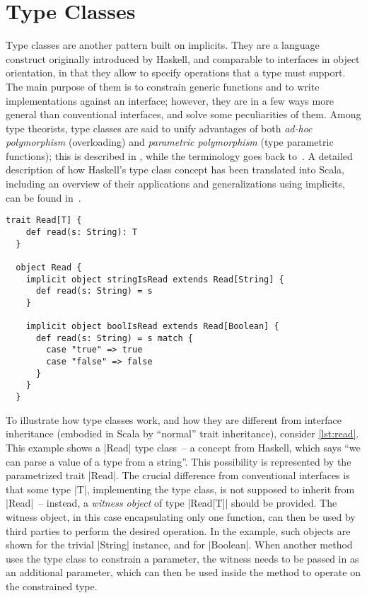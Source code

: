 
\section{Type Classes}
\label{sec:type_classes}

Type classes are another pattern built on implicits. They are a language construct originally
introduced by Haskell, and comparable to interfaces in object orientation, in that they allow to
specify operations that a type must support. The main purpose of them is to constrain generic
functions and to write implementations against an interface; however, they are in a few ways more
general than conventional interfaces, and solve some peculiarities of them. Among type theorists,
type classes are said to unify advantages of both \emph{ad-hoc polymorphism} (overloading) and
\emph{parametric polymorphism} (type parametric functions); this is described in
\cite{wadler1989:ad-hoc}, while the terminology goes back to~\cite{strachey2000:fundamental}. A
detailed description of how Haskell's type class concept has been translated into Scala, including
an overview of their applications and generalizations using implicits, can be found
in~\cite{oliveira2010:type-classes}.

\begin{lstlisting}[style=floating, 
  caption={\lstinline|Read| type class, together with implementations for strings and booleans.~%
  \github{dsl-examples/blob/master/src/main/scala/dsl_examples/Read.scala}},
  label={lst:read}]
  trait Read[T] { 
    def read(s: String): T 
  }

  object Read {
    implicit object stringIsRead extends Read[String] {
      def read(s: String) = s
    }

    implicit object boolIsRead extends Read[Boolean] {
      def read(s: String) = s match {
        case "true" => true
        case "false" => false
      }
    }
  }
\end{lstlisting}

To illustrate how type classes work, and how they are different from interface inheritance (embodied
in Scala by \enquote{normal} trait inheritance), consider \autoref{lst:read}. This example shows a
|Read| type class~-- a concept from Haskell, which says \enquote{we can parse a value of a type from
  a string}. This possibility is represented by the parametrized trait |Read|. The crucial
difference from conventional interfaces is that some type |T|, implementing the type class, is not
supposed to inherit from |Read|~-- instead, a \emph{witness object} of type |Read[T]| should be
provided. The witness object, in this case encapsulating only one function, can then be used by
third parties to perform the desired operation. In the example, such objects are shown for the
trivial |String| instance, and for |Boolean|. When another method uses the type class to constrain a
parameter, the witness needs to be passed in as an additional parameter, which can then be used
inside the method to operate on the constrained type.

